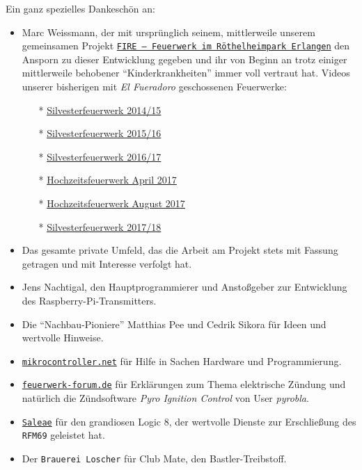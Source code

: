\documentclass[paper=a4, parskip, numbers=noenddot, toc=listof, headsepline]{scrbook}
\newcommand{\pic}{\emph{Pyro Ignition Control}}
\newcommand{\anlage}{\emph{El Fueradoro}}
\begin{document}
		Ein ganz spezielles Dankeschön an:
		\begin{itemize}
			\item Marc Weissmann, der mit ursprünglich seinem, mittlerweile unserem gemeinsamen Projekt \href{http://www.facebook.com/FIREErlangen}{\texttt{FIRE~-- Feuerwerk im Röthel\-heim\-park Er\-langen}} den Ansporn zu dieser Entwicklung gegeben und ihr von Beginn an trotz einiger mittlerweile behobener \enquote{Kinderkrankheiten} immer voll vertraut hat. Videos unserer bisherigen mit {\anlage} geschossenen Feuerwerke:
			      \begin{itemize}
				      \item[*] \underline{\href{https://vimeo.com/116115628}{Silvesterfeuerwerk 2014/15}}
				      \item[*] \underline{\href{https://vimeo.com/150594996}{Silvesterfeuerwerk 2015/16}}
				      \item[*] \underline{\href{https://vimeo.com/198168273}{Silvesterfeuerwerk 2016/17}}
				      \item[*] \underline{\href{https://www.youtube.com/watch?v=uPTW1dpsVoU}{Hochzeitsfeuerwerk April 2017}}
				      \item[*] \underline{\href{https://www.youtube.com/watch?v=q-nfOxinUgU}{Hochzeitsfeuerwerk August 2017}}
				      \item[*] \underline{\href{https://www.youtube.com/watch?v=unH9tJSg1mw}{Silvesterfeuerwerk 2017/18}}
			      \end{itemize}
			\item Das gesamte private Umfeld, das die Arbeit am Projekt stets mit Fassung getragen und mit Interesse verfolgt hat.
			\item Jens Nachtigal, den Hauptprogrammierer und Anstoßgeber zur Entwicklung des Raspberry-Pi-Transmitters.
			\item Die \enquote{Nachbau-Pioniere} Matthias Pee und Cedrik Sikora für Ideen und wertvolle Hinweise.
			\item \href{http://www.mikrocontroller.net}{\texttt{mikrocontroller.net}} für Hilfe in Sachen Hardware und Programmierung.
			\item \href{http://www.feuerwerk-forum.de}{\texttt{feuerwerk-forum.de}} für Erklärungen zum Thema elektrische Zündung und natürlich die Zündsoftware {\pic} von User \emph{pyrobla}.
			\item \href{http://www.saleae.com}{\texttt{Saleae}} für den grandiosen Logic 8, der wertvolle Dienste zur Erschließung des \texttt{RFM69} geleistet hat.
			\item Der \texttt{Brauerei Loscher} für Club Mate, den Bastler-Treibstoff.

\end{itemize}
\end{document}
